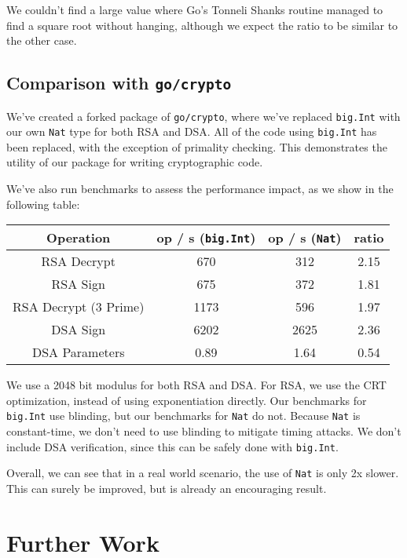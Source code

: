 \documentclass[11pt, a4paper]{article} %
\begin{document}
{We couldn't find a large value where Go's Tonneli Shanks routine
managed to find a square root without hanging, although we
expect the ratio to be similar to the other case.

\subsection{Comparison with \texttt{go/crypto}}

We've created a forked package
\cite{meier_cronokirbyctcrypto_2021}
of \texttt{go/crypto}, where we've replaced \texttt{big.Int}
with our own \texttt{Nat} type for both RSA and DSA. All of the code
using \texttt{big.Int} has been replaced, with the exception of
primality checking. This demonstrates the utility of
our package for writing cryptographic code.

We've also run benchmarks to assess the performance impact, as we
show in the following table:

\begin{center}
 \begin{tabular}{|c | c | c | c|} 
 \hline
 Operation & op / s (\texttt{big.Int}) & op / s (\texttt{Nat}) & ratio \\ [0.5ex] 
 \hline\hline
 RSA Decrypt & 670 & 312 & 2.15 \\
 \hline
 RSA Sign & 675 & 372 & 1.81 \\
 \hline
 RSA Decrypt (3 Prime) & 1173 & 596 & 1.97 \\
 \hline
 DSA Sign & 6202 & 2625 & 2.36 \\
 \hline
 DSA Parameters & 0.89 & 1.64 & 0.54 \\
 \hline
\end{tabular}
\end{center}

We use a 2048 bit modulus for both RSA and DSA. For RSA, we use
the CRT optimization, instead of using exponentiation directly.
Our benchmarks for \texttt{big.Int} use blinding, but our benchmarks
for \texttt{Nat} do not. Because \texttt{Nat} is constant-time,
we don't need to use blinding to mitigate timing attacks.
We don't include DSA verification, since this can be safely done
with \texttt{big.Int}.

Overall, we can see that in a real world scenario, the use
of \texttt{Nat} is only 2x slower. This can surely be improved,
but is already an encouraging result.

\section{Further Work}

}
\end{document}
